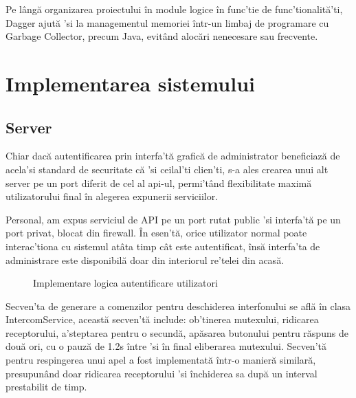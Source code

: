 Pe lângă organizarea proiectului în module logice în func'tie de func'tionalită'ti, Dagger ajută 'si la managementul memoriei într-un limbaj de programare cu Garbage Collector, precum Java, evitând alocări nenecesare sau frecvente.


\section {Implementarea sistemului}

\subsection {Server}

Chiar dacă autentificarea prin interfa'tă grafică de administrator beneficiază de acela'si standard de securitate că 'si ceilal'ti clien'ti, s-a ales crearea unui alt server pe un port diferit de cel al \acrshort{api}-ul, permi'tând flexibilitate maximă utilizatorului final în alegerea expunerii serviciilor.

Personal, am expus serviciul de API pe un port rutat public 'si interfa'tă pe un port privat, blocat din firewall. În esen'tă, orice utilizator normal poate interac'tiona cu sistemul atâta timp cât este autentificat, însă interfa'ta de administrare este disponibilă doar din interiorul re'telei din acasă.

\begin{figure}[H]
\begin{center}
  \hfill
  \caption{Implementare logica autentificare utilizatori}
  \label{fig:jwt}
\end{center}
\end{figure}

Secven'ta de generare a comenzilor pentru deschiderea interfonului se află în clasa IntercomService, această secven'tă include: ob'tinerea mutexului, ridicarea receptorului, a'steptarea pentru o secundă, apăsarea butonului pentru răspuns de două ori, cu o pauză de 1.2s între 'si în final eliberarea mutexului. Secven'tă pentru respingerea unui apel a fost implementată într-o manieră similară, presupunând doar ridicarea receptorului 'si închiderea sa după un interval prestabilit de timp.

